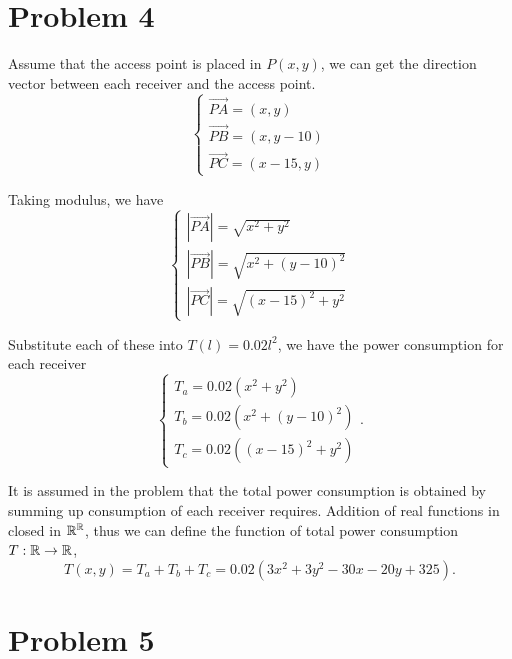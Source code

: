 \documentclass[12pt,a4paper]{article}
\begin{document}
\section*{Problem 4}
\begin{solution}
    Assume that the access point is placed in $P(x,y)$, we can get the direction vector between each receiver and the access point.
    \[
    \begin{cases}
        \overrightarrow{PA} = (x,y)\\
        \overrightarrow{PB} = (x, y-10)\\
        \overrightarrow{PC} = (x-15,y)
    \end{cases}
    \]

    Taking modulus, we have 
    \[
    \begin{cases}
        |\overrightarrow{PA}| = \sqrt{x^{2} +y^{2}}\\
        |\overrightarrow{PB}| = \sqrt{x^{2} +( y-10)^{2}}\\
        |\overrightarrow{PC}| = \sqrt{(x-15)^{2} +y^{2}}
    \end{cases}
    \]

Substitute each of these into $T(l) = 0.02l^2$, we have the power consumption for each receiver
\[
\begin{cases}
    T_a = 0.02(x^{2} +y^{2})\\
    T_b = 0.02(x^{2} +( y-10)^{2})\\
    T_c = 0.02((x-15)^{2} +y^{2})
\end{cases}.
\]

It is assumed in the problem that the total power consumption is obtained by summing up consumption of each receiver requires. Addition of real functions in closed in $\mathbb{R}^{\mathbb{R}}$, thus we can define the function of total power consumption $T: \mathbb{R} \to \mathbb{R}$,
\[
T(x,y) = T_a + T_b + T_c =0.02\left(3x^{2} +3y^{2} -30x-20y+325\right).
\]  
\end{solution}

\section*{Problem 5}
\begin{comment}
\begin{figure}[H]
    \centering
    \begin{tikzpicture}[scale=1.2]
    \begin{axis}[
        view={45}{45}, %
        xlabel={$x$},
        ylabel={$y$},
        zlabel={$T(x,y)$},
        colormap/jet, %
        colorbar, %
        colorbar style={ylabel={}}, %
        samples=50, %
        ]
        \addplot3[
            surf, %
            domain = 0:20,
            y domain = 0:20,
        ]
        {0.02*(3*x^2 + 3*y^2 - 30*x - 20*y + 325)};
    \end{axis}
    \end{tikzpicture}
    \caption{$T(x,y)$}
\end{figure}
\end{comment}
\end{document}
